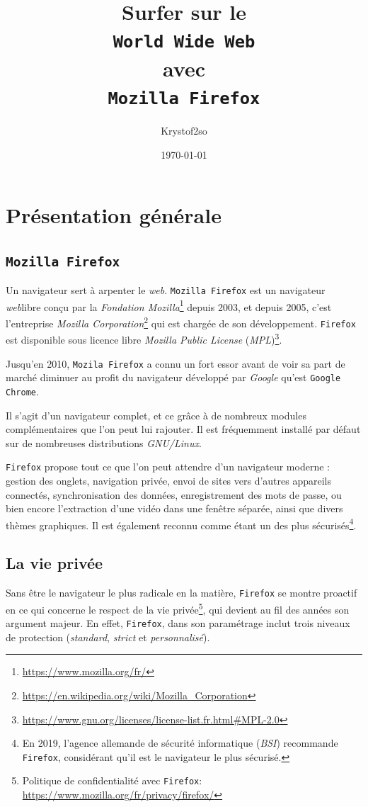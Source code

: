 \documentclass[a4paper,11pt]{book}
\title{Surfer sur le \\ \texttt{World Wide Web} \\ avec \\ \texttt{Mozilla Firefox}}
\author{Krystof2so}
\date{\today}
\begin{document}
\maketitle
\frontmatter
\chapter*{Présentation générale}
\section*{\texttt{Mozilla Firefox}}
Un navigateur sert à arpenter le \textit{web}. \texttt{Mozilla Firefox} est un navigateur \textit{web}libre conçu par la \textit{Fondation Mozilla}\footnote{\url{https://www.mozilla.org/fr/}} depuis 2003, et depuis 2005, c'est l'entreprise \textit{Mozilla Corporation}\footnote{\url{https://en.wikipedia.org/wiki/Mozilla_Corporation}} qui est chargée de son développement. \texttt{Firefox} est disponible sous licence libre \textit{Mozilla Public License} (\textit{MPL})\footnote{\url{https://www.gnu.org/licenses/license-list.fr.html#MPL-2.0}}.
\medskip

Jusqu'en 2010, \texttt{Mozila Firefox} a connu un fort essor avant de voir sa part de marché diminuer au profit du navigateur développé par \textit{Google} qu'est \texttt{Google Chrome}.
\medskip

Il s'agit d'un navigateur complet, et ce grâce à de nombreux modules complémentaires que l'on peut lui rajouter. Il est fréquemment installé par défaut sur de nombreuses distributions \textit{GNU/Linux}.
\medskip

\texttt{Firefox} propose tout ce que l’on peut attendre d’un navigateur moderne : gestion des onglets, navigation privée, envoi de sites vers d’autres appareils connectés, synchronisation des données, enregistrement des mots de passe, ou bien encore l’extraction d’une vidéo dans une fenêtre séparée, ainsi que divers thèmes graphiques. Il est également reconnu comme étant un des plus sécurisés\footnote{En 2019, l'agence allemande de sécurité informatique (\textit{BSI}) recommande \texttt{Firefox}, considérant qu'il est le navigateur le plus sécurisé.}.
\medskip

\section*{La vie privée}
Sans être le navigateur le plus radicale en la matière, \texttt{Firefox} se montre proactif en ce qui concerne le respect de la vie privée\footnote{Politique de confidentialité avec \texttt{Firefox}: \url{https://www.mozilla.org/fr/privacy/firefox/}}, qui devient au fil des années son argument majeur. En effet, \texttt{Firefox}, dans son paramétrage inclut trois niveaux de protection (\textit{standard}, \textit{strict} et \textit{personnalisé}).
\medskip
\end{document}
